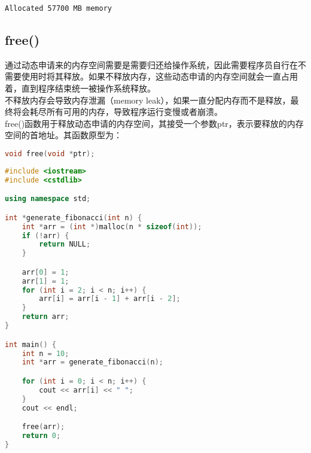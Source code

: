 \begin{tcolorbox}
    \begin{verbatim}
Allocated 57700 MB memory
	\end{verbatim}
\end{tcolorbox}

\vspace{0.5cm}

\subsection{free()}

通过动态申请来的内存空间需要是需要归还给操作系统，因此需要程序员自行在不需要使用时将其释放。如果不释放内存，这些动态申请的内存空间就会一直占用着，直到程序结束统一被操作系统释放。\\

不释放内存会导致内存泄漏（memory leak），如果一直分配内存而不是释放，最终将会耗尽所有可用的内存，导致程序运行变慢或者崩溃。\\

free()函数用于释放动态申请的内存空间，其接受一个参数ptr，表示要释放的内存空间的首地址。其函数原型为：

\vspace{-0.5cm}

\begin{lstlisting}[language=C++]
void free(void *ptr);
\end{lstlisting}

\vspace{0.5cm}


\begin{lstlisting}[language=C++]
#include <iostream>
#include <cstdlib>

using namespace std;

int *generate_fibonacci(int n) {
    int *arr = (int *)malloc(n * sizeof(int));
    if (!arr) {
        return NULL;
    }

    arr[0] = 1;
    arr[1] = 1;
    for (int i = 2; i < n; i++) {
        arr[i] = arr[i - 1] + arr[i - 2];
    }
    return arr;
}

int main() {
    int n = 10;
    int *arr = generate_fibonacci(n);

    for (int i = 0; i < n; i++) {
        cout << arr[i] << " ";
    }
    cout << endl;

    free(arr);
    return 0;
}
\end{lstlisting}

